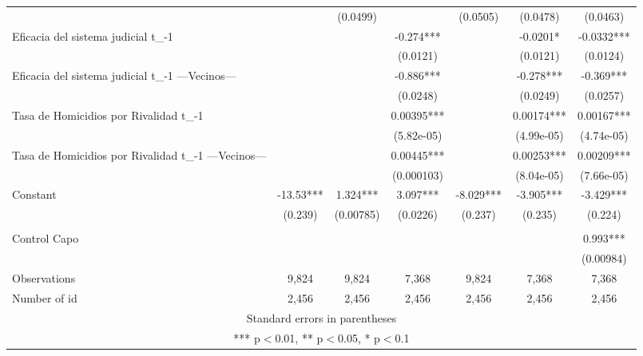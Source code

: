{\begin{tabular}{lcccccc}
 &  & (0.0499) &  & (0.0505) & (0.0478) & (0.0463) \\
\rowcolor{Red}Eficacia del sistema judicial t_{-1} &  &  & -0.274*** &  & -0.0201* & -0.0332*** \\
 &  &  & (0.0121) &  & (0.0121) & (0.0124) \\
\rowcolor{Red}Eficacia del sistema judicial t_{-1} —Vecinos— &  &  & -0.886*** &  & -0.278*** & -0.369*** \\
 &  &  & (0.0248) &  & (0.0249) & (0.0257) \\
\rowcolor{Red}Tasa de Homicidios por Rivalidad t_{-1} &  &  & 0.00395*** &  & 0.00174*** & 0.00167*** \\
 &  &  & (5.82e-05) &  & (4.99e-05) & (4.74e-05) \\
\rowcolor{Red}Tasa de Homicidios por Rivalidad t_{-1} —Vecinos— &  &  & 0.00445*** &  & 0.00253*** & 0.00209*** \\
 &  &  & (0.000103) &  & (8.04e-05) & (7.66e-05) \\
Constant & -13.53*** & 1.324*** & 3.097*** & -8.029*** & -3.905*** & -3.429*** \\
 & (0.239) & (0.00785) & (0.0226) & (0.237) & (0.235) & (0.224) \\
 &  &  &  &  &  &  \\
\hline
Control Capo &  &  &  &  &  & 0.993*** \\
 &  &  &  &  &  & (0.00984) \\
 \hline
Observations & 9,824 & 9,824 & 7,368 & 9,824 & 7,368 & 7,368 \\
 Number of id & 2,456 & 2,456 & 2,456 & 2,456 & 2,456 & 2,456 \\ \hline
\multicolumn{7}{c}{ Standard errors in parentheses} \\
\multicolumn{7}{c}{ *** p$<$0.01, ** p$<$0.05, * p$<$0.1} \\
\end{tabular}
}